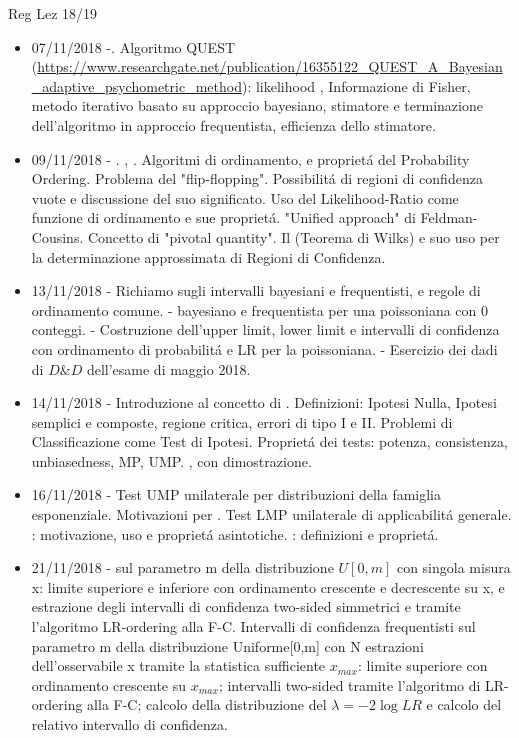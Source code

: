 \begin{frame}[allowframebreaks]{Reg Lez 18/19}
\begin{itemize}
\item 07/11/2018 -. Algoritmo QUEST (\url{https://www.researchgate.net/publication/16355122_QUEST_A_Bayesian_adaptive_psychometric_method}): likelihood , Informazione di Fisher, metodo iterativo basato su approccio bayesiano, stimatore e terminazione dell'algoritmo in approccio frequentista, efficienza dello stimatore.
\item 09/11/2018 - . , . Algoritmi di ordinamento, e propriet\'a del Probability Ordering. Problema del "flip-flopping". Possibilit\'a di regioni di confidenza vuote e discussione del suo significato. Uso del Likelihood-Ratio come funzione di ordinamento e sue propriet\'a. "Unified approach" di Feldman-Cousins. Concetto di "pivotal quantity". Il  (Teorema di Wilks) e suo uso per la determinazione approssimata di Regioni di Confidenza.
\item 13/11/2018 - Richiamo sugli intervalli bayesiani e frequentisti, e regole di ordinamento comune. -  bayesiano e frequentista per una poissoniana con 0 conteggi. - Costruzione dell'upper limit, lower limit e intervalli di confidenza con ordinamento di probabilit\'a e LR per la poissoniana. - Esercizio dei dadi di $D\&D$ dell'esame di maggio 2018.
\item 14/11/2018 - Introduzione al concetto di . Definizioni: Ipotesi Nulla, Ipotesi semplici e composte, regione critica, errori di tipo I e II. Problemi di Classificazione come Test di Ipotesi. Propriet\'a dei tests: potenza, consistenza, unbiasedness, MP, UMP. , con dimostrazione.
\item 16/11/2018 - Test UMP unilaterale per distribuzioni della famiglia esponenziale. Motivazioni per . Test LMP unilaterale di applicabilit\'a generale. : motivazione, uso e propriet\'a asintotiche. : definizioni e propriet\'a.
\item 21/11/2018 -  sul parametro m della distribuzione $U[0,m]$ con singola misura x: limite superiore e inferiore con ordinamento crescente e decrescente su x, e estrazione degli intervalli di confidenza two-sided simmetrici e tramite l’algoritmo LR-ordering alla F-C. Intervalli di confidenza frequentisti sul parametro m della distribuzione Uniforme[0,m] con N estrazioni dell’osservabile x tramite la statistica sufficiente $x_{max}$: limite superiore con ordinamento crescente su $x_{max}$; intervalli two-sided tramite l’algoritmo di LR-ordering alla F-C; calcolo della distribuzione del $\lambda=-2\log{LR}$ e calcolo del relativo intervallo di confidenza.

\end{itemize}
\end{frame}
